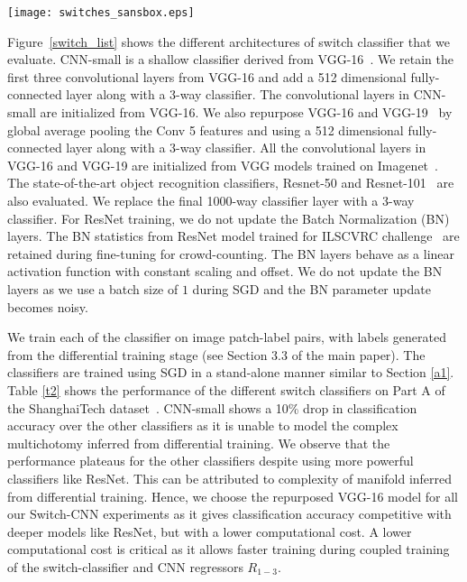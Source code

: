\documentclass[10pt,twocolumn,letterpaper]{article}
\begin{document}
\begin{figure*}[t]
\centering
 \texttt{[image: switches\_sansbox.eps]}\hspace{0.3cm}%
 \caption{The architecture of different switch classifiers evaluated in \textbf{Switch-CNN}.}
\label{switch_list}
\end{figure*}
Figure~\ref{switch_list} shows the different architectures of switch classifier that we evaluate. CNN-small is a shallow classifier derived from VGG-16~\cite{simonyan2014very}. We retain the first three convolutional layers from VGG-16 and add a 512 dimensional fully-connected layer along with a 3-way classifier. The convolutional layers in CNN-small are initialized from VGG-16. We also repurpose VGG-16 and VGG-19~\cite{simonyan2014very} by global average pooling the Conv 5 features and using a 512 dimensional fully-connected layer along with a 3-way classifier. All the convolutional layers in VGG-16 and VGG-19 are initialized from VGG models trained on Imagenet~\cite{deng2009imagenet}. The state-of-the-art object recognition classifiers, Resnet-50 and Resnet-101~\cite{he2015deep} are also evaluated. We replace the final 1000-way classifier layer with a 3-way classifier. For ResNet training, we do not update the Batch Normalization (BN) layers. The BN statistics from ResNet model trained for ILSCVRC challenge~\cite{deng2009imagenet} are retained during fine-tuning for crowd-counting. The BN layers behave as a linear activation function with constant scaling and offset. We do not update the BN layers as we use a batch size of $1$ during SGD and the BN parameter update becomes noisy. 

We train each of the classifier on image patch-label pairs, with labels generated from the differential training stage (see Section 3.3 of the main paper). The classifiers are trained using SGD in a stand-alone manner similar to Section \ref{a1}.
Table \ref{t2} shows the performance of the different switch classifiers on Part A of the ShanghaiTech dataset~\cite{zhang2016single}. CNN-small shows a 10\% drop in classification accuracy over the other classifiers as it is unable to model the complex multichotomy inferred from differential training. We observe that the performance plateaus for the other classifiers despite using more powerful classifiers like ResNet. This can be attributed to complexity of manifold inferred from differential training. Hence, we choose the repurposed VGG-16 model for all our Switch-CNN experiments as it gives classification accuracy competitive with deeper models like ResNet, but with a lower computational cost. A lower computational cost is critical as it allows faster training during coupled training of the switch-classifier and CNN regressors $R_{1-3}$.  
\end{document}
